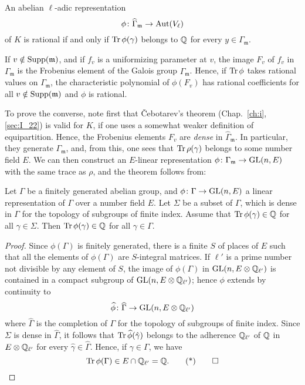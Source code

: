 \begin{thm}
	An abelian $\ell$-adic representation
	\[
		\phi \colon \widehat{\Gamma}_{\mathfrak{m}} \to \operatorname{Aut}(V_\ell)
	\]
	\dpage
	of $K$ is rational if and only if $\operatorname{Tr}\phi(\gamma)$ belongs to $\mathbb{Q}$
	for every $y \in \Gamma_{\mathfrak{m}}$.
\end{thm}

If $v \notin \operatorname{Supp}(\mathfrak{m})$, and if $f_v$ is a uniformizing parameter at
$v$, the image $F_v$ of $f_v$ in $\Gamma_{\mathfrak{m}}$ is the Frobenius
element of the Galois group $\widehat{\Gamma}_{\mathfrak{m}}$. Hence, if
$\operatorname{Tr}\phi$ takes rational values on $\Gamma_{\mathfrak{m}}$, the
characteristic polynomial of $\phi(F_v)$ has rational coefficients for all
$v \notin \operatorname{Supp}(\mathfrak{m})$ and $\phi$ is rational.

To prove the converse, note first that \v Cebotarev's theorem
(Chap.~\ref{ch:i}, \ref{sec:I_22}) is valid for $K$, if one uses a somewhat
weaker definition of equipartition. Hence, the Frobenius elements $F_v$ are
\emph{dense} in $\widehat{\Gamma}_{\mathfrak{m}}$. In particular, they generate
$\Gamma_{\mathfrak{m}}$, and, from this, one sees that $\operatorname{Tr}\rho(\gamma)$
belongs to some number field $E$. We can then construct an $E$-linear
representation $\phi\colon \Gamma_{\mathfrak{m}} \to \operatorname{GL}(n, E)$ with the same
trace as $\rho$, and the theorem follows from:

\begin{lem}
	Let $\Gamma$ be a finitely generated abelian group, and $\phi\colon
	\Gamma \to \operatorname{GL}(n, E)$ a linear representation of $\Gamma$ over a number
	field $E$. Let $\Sigma$ be a subset of $\Gamma$, which is dense in
	$\Gamma$ for the topology of subgroups of finite index. Assume that
	$\operatorname{Tr}\phi(\gamma) \in \mathbb{Q}$ for all $\gamma \in \Sigma$. Then
	$\operatorname{Tr}\phi(\gamma) \in \mathbb{Q}$ for all $\gamma \in \Gamma$.
\end{lem}
\begin{proof}
	Since $\phi(\Gamma)$ is finitely generated, there is a finite $S$ of
	places of $E$ such that all the elements of $\phi(\Gamma)$ are
	$S$-integral matrices. If $\ell'$ is a prime number not divisible by
	any element of $S$, the image of $\phi(\Gamma)$ in $\operatorname{GL}(n, E \otimes
	\mathbb{Q}_{\ell'})$ is contained in a compact subgroup of $\operatorname{GL}(n, E \otimes
	\mathbb{Q}_{\ell'})$; hence $\phi$ extends by continuity to
	\dpage
	\[
		\widehat{\phi} \colon \widehat{\Gamma} \to \operatorname{GL}(n, E \otimes
		\mathbb{Q}_{\ell'})
	\]
	where $\widehat{\Gamma}$ is the completion of $\Gamma$ for the topology
	of subgroups of finite index. Since $\Sigma$ is dense in
	$\widehat{\Gamma}$, it follows that $\operatorname{Tr}\widehat{\phi}(\hat\gamma)$
	belongs to the adherence $\mathbb{Q}_{\ell'}$ of $\mathbb{Q}$ in $E \otimes \mathbb{Q}_{\ell'}$
	for every $\hat\gamma \in \widehat{\Gamma}$.  Hence, if $\gamma \in
	\Gamma$, we have
	\begin{equation}
		\Tr \phi(\Gamma) \in E \cap \Q_{\ell'} = \Q.
		\tqedhere
	\end{equation}
\end{proof}

